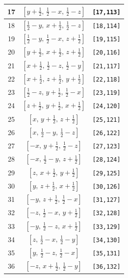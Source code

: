 \documentclass[fleqn,8pt]{jsarticle}
\begin{document}
\begin{longtable}{ccc}
17 & $\left[ y + \frac{1}{2},\, \frac{1}{2} - x,\, \frac{1}{2} - z \right]$ & {\tt [17,113]} \\ \hline
18 & $\left[ \frac{1}{2} - y,\, x + \frac{1}{2},\, \frac{1}{2} - z \right]$ & {\tt [18,114]} \\ \hline
19 & $\left[ \frac{1}{2} - y,\, \frac{1}{2} - x,\, z + \frac{1}{2} \right]$ & {\tt [19,115]} \\ \hline
20 & $\left[ y + \frac{1}{2},\, x + \frac{1}{2},\, z + \frac{1}{2} \right]$ & {\tt [20,116]} \\ \hline
21 & $\left[ x + \frac{1}{2},\, \frac{1}{2} - z,\, \frac{1}{2} - y \right]$ & {\tt [21,117]} \\ \hline
22 & $\left[ x + \frac{1}{2},\, z + \frac{1}{2},\, y + \frac{1}{2} \right]$ & {\tt [22,118]} \\ \hline
23 & $\left[ \frac{1}{2} - z,\, y + \frac{1}{2},\, \frac{1}{2} - x \right]$ & {\tt [23,119]} \\ \hline
24 & $\left[ z + \frac{1}{2},\, y + \frac{1}{2},\, x + \frac{1}{2} \right]$ & {\tt [24,120]} \\ \hline
25 & $\left[ x,\, y + \frac{1}{2},\, z + \frac{1}{2} \right]$ & {\tt [25,121]} \\ \hline
26 & $\left[ x,\, \frac{1}{2} - y,\, \frac{1}{2} - z \right]$ & {\tt [26,122]} \\ \hline
27 & $\left[ - x,\, y + \frac{1}{2},\, \frac{1}{2} - z \right]$ & {\tt [27,123]} \\ \hline
28 & $\left[ - x,\, \frac{1}{2} - y,\, z + \frac{1}{2} \right]$ & {\tt [28,124]} \\ \hline
29 & $\left[ z,\, x + \frac{1}{2},\, y + \frac{1}{2} \right]$ & {\tt [29,125]} \\ \hline
30 & $\left[ y,\, z + \frac{1}{2},\, x + \frac{1}{2} \right]$ & {\tt [30,126]} \\ \hline
31 & $\left[ - y,\, z + \frac{1}{2},\, \frac{1}{2} - x \right]$ & {\tt [31,127]} \\ \hline
32 & $\left[ - z,\, \frac{1}{2} - x,\, y + \frac{1}{2} \right]$ & {\tt [32,128]} \\ \hline
33 & $\left[ - y,\, \frac{1}{2} - z,\, x + \frac{1}{2} \right]$ & {\tt [33,129]} \\ \hline
34 & $\left[ z,\, \frac{1}{2} - x,\, \frac{1}{2} - y \right]$ & {\tt [34,130]} \\ \hline
35 & $\left[ y,\, \frac{1}{2} - z,\, \frac{1}{2} - x \right]$ & {\tt [35,131]} \\ \hline
36 & $\left[ - z,\, x + \frac{1}{2},\, \frac{1}{2} - y \right]$ & {\tt [36,132]} \\ \hline

\end{longtable}
\end{document}
